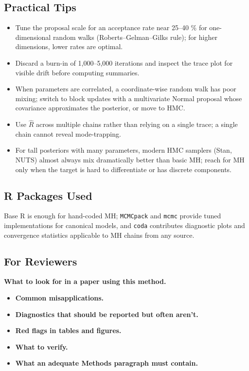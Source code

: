 \documentclass[
]{article}
\providecommand{\tightlist}{%
  \setlength{\itemsep}{0pt}\setlength{\parskip}{0pt}}
\begin{document}
\subsection{Practical Tips}\label{practical-tips}

\begin{itemize}
\tightlist
\item
  Tune the proposal scale for an acceptance rate near 25--40 \% for
  one-dimensional random walks (Roberts--Gelman--Gilks rule); for higher
  dimensions, lower rates are optimal.
\item
  Discard a burn-in of 1,000--5,000 iterations and inspect the trace
  plot for visible drift before computing summaries.
\item
  When parameters are correlated, a coordinate-wise random walk has poor
  mixing; switch to block updates with a multivariate Normal proposal
  whose covariance approximates the posterior, or move to HMC.
\item
  Use \(\hat R\) across multiple chains rather than relying on a single
  trace; a single chain cannot reveal mode-trapping.
\item
  For tall posteriors with many parameters, modern HMC samplers (Stan,
  NUTS) almost always mix dramatically better than basic MH; reach for
  MH only when the target is hard to differentiate or has discrete
  components.
\end{itemize}

\subsection{R Packages Used}\label{r-packages-used}

Base R is enough for hand-coded MH; \texttt{MCMCpack} and \texttt{mcmc}
provide tuned implementations for canonical models, and \texttt{coda}
contributes diagnostic plots and convergence statistics applicable to MH
chains from any source.

\subsection{For Reviewers}\label{for-reviewers}

\textbf{What to look for in a paper using this method.}

\begin{itemize}
\tightlist
\item
  \textbf{Common misapplications.}
\item
  \textbf{Diagnostics that should be reported but often aren't.}
\item
  \textbf{Red flags in tables and figures.}
\item
  \textbf{What to verify.}
\item
  \textbf{What an adequate Methods paragraph must contain.}
\end{itemize}
\end{document}
